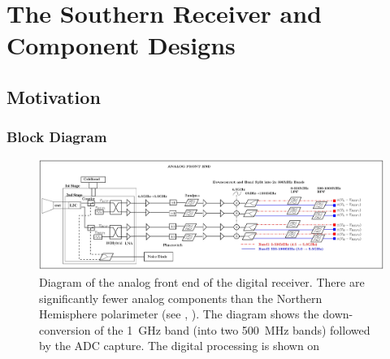 \chapter{The Southern Receiver and Component Designs}

\section{Motivation}

  \subsection{Block Diagram}

\begin{figure}[ht]
 \centering
 \includegraphics[width=\textwidth,height=0.4\textheight]{images/receiver_schematics/rfNew.jpg} %
 \caption{Diagram of the analog front end of the digital receiver. There are significantly fewer analog components than the Northern Hemisphere polarimeter (see , ). The diagram shows the down-conversion of the 1~GHz band (into two 500~MHz bands) followed by the ADC capture. The digital processing is shown on   }
 \label{fig:digital_receiver}
\end{figure}

